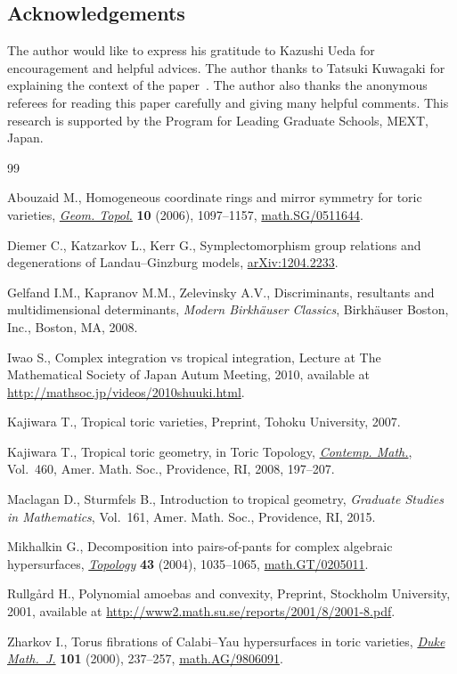 \documentclass[pdftex]{sigma}
\numberwithin{equation}{section}
\begin{document}
\subsection*{Acknowledgements}
The author would like to express his gratitude to Kazushi Ueda for encouragement and helpful advices. The author thanks to Tatsuki Kuwagaki for explaining the context of the paper~\cite{DKK}. The author also thanks the anonymous referees for reading this paper carefully and giving many helpful comments. This research is supported by the Program for Leading Graduate Schools, MEXT, Japan.

\begin{thebibliography}{99}
\footnotesize\itemsep=0pt

Abouzaid M., Homogeneous coordinate rings and mirror symmetry for toric
 varieties, \href{http://dx.doi.org/10.2140/gt.2006.10.1097}{\textit{Geom. Topol.}} \textbf{10} (2006), 1097--1157,
 \href{http://arxiv.org/abs/math.SG/0511644}{math.SG/0511644}.

Diemer C., Katzarkov L., Kerr G., Symplectomorphism group relations and
 degenerations of {L}andau--{G}inzburg models, \href{http://arxiv.org/abs/1204.2233}{arXiv:1204.2233}.

Gelfand I.M., Kapranov M.M., Zelevinsky A.V., Discriminants, resultants and
 multidimensional determinants, \textit{Modern Birkh\"auser Classics}, Birkh\"auser
 Boston, Inc., Boston, MA, 2008.

Iwao S., Complex integration vs tropical integration, {L}ecture at The
 {M}athematical {S}ociety of {J}apan {A}utum {M}eeting, 2010, available at \url{http://mathsoc.jp/videos/2010shuuki.html}.

Kajiwara T., Tropical toric varieties, {P}reprint, Tohoku University, 2007.

Kajiwara T., Tropical toric geometry, in Toric Topology, \href{http://dx.doi.org/10.1090/conm/460/09018}{\textit{Contemp.
 Math.}}, Vol.~460, Amer. Math. Soc., Providence, RI, 2008, 197--207.

Maclagan D., Sturmfels B., Introduction to tropical geometry, \textit{Graduate
 Studies in Mathematics}, Vol.~161, Amer. Math. Soc., Providence, RI, 2015.

Mikhalkin G., Decomposition into pairs-of-pants for complex algebraic
 hypersurfaces, \href{http://dx.doi.org/10.1016/j.top.2003.11.006}{\textit{Topology}} \textbf{43} (2004), 1035--1065,
 \href{http://arxiv.org/abs/math.GT/0205011}{math.GT/0205011}.

Rullg{\aa}rd H., Polynomial amoebas and convexity, {P}reprint, Stockholm
 University, 2001, available at \url{http://www2.math.su.se/reports/2001/8/2001-8.pdf}.

Zharkov I., Torus f\/ibrations of {C}alabi--{Y}au hypersurfaces in toric
 varieties, \href{http://dx.doi.org/10.1215/S0012-7094-00-10124-X}{\textit{Duke Math.~J.}} \textbf{101} (2000), 237--257,
 \href{http://arxiv.org/abs/math.AG/9806091}{math.AG/9806091}.

\end{thebibliography}\LastPageEnding
\end{document}
